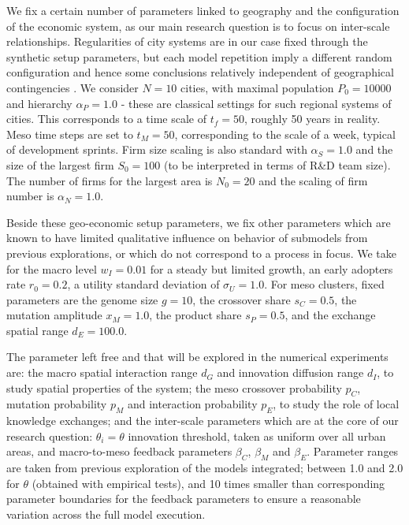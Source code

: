 \documentclass[letterpaper]{article}
\begin{document}


We fix a certain number of parameters linked to geography and the configuration of the economic system, as our main research question is to focus on inter-scale relationships. Regularities of city systems are in our case fixed through the synthetic setup parameters, but each model repetition imply a different random configuration and hence some conclusions relatively independent of geographical contingencies \cite{raimbault2019space}. We consider $N=10$ cities, with maximal population $P_0 = 10000$ and hierarchy $\alpha_P = 1.0$ - these are classical settings for such regional systems of cities. This corresponds to a time scale of $t_f = 50$, roughly 50 years in reality. Meso time steps are set to $t_M=50$, corresponding to the scale of a week, typical of development sprints. Firm size scaling is also standard with $\alpha_S = 1.0$ and the size of the largest firm $S_0 = 100$ (to be interpreted in terms of R\&D team size). The number of firms for the largest area is $N_0 = 20$ and the scaling of firm number is $\alpha_N = 1.0$.

Beside these geo-economic setup parameters, we fix other parameters which are known to have limited qualitative influence on behavior of submodels from previous explorations, or which do not correspond to a process in focus. We take for the macro level $w_I = 0.01$ for a steady but limited growth, an early adopters rate $r_0=0.2$, a utility standard deviation of $\sigma_U = 1.0$. For meso clusters, fixed parameters are the genome size $g=10$, the crossover share $s_C=0.5$, the mutation amplitude $x_M=1.0$, the product share $s_P=0.5$, and the exchange spatial range $d_E = 100.0$.

The parameter left free and that will be explored in the numerical experiments are: the macro spatial interaction range $d_G$ and innovation diffusion range $d_I$, to study spatial properties of the system; the meso crossover probability $p_C$, mutation probability $p_M$ and interaction probability $p_E$, to study the role of local knowledge exchanges; and the inter-scale parameters which are at the core of our research question: $\theta_i = \theta$ innovation threshold, taken as uniform over all urban areas, and macro-to-meso feedback parameters $\beta_C$, $\beta_M$ and $\beta_E$. Parameter ranges are taken from previous exploration of the models integrated; between 1.0 and 2.0 for $\theta$ (obtained with empirical tests), and 10 times smaller than corresponding parameter boundaries for the feedback parameters to ensure a reasonable variation across the full model execution.
\end{document}
